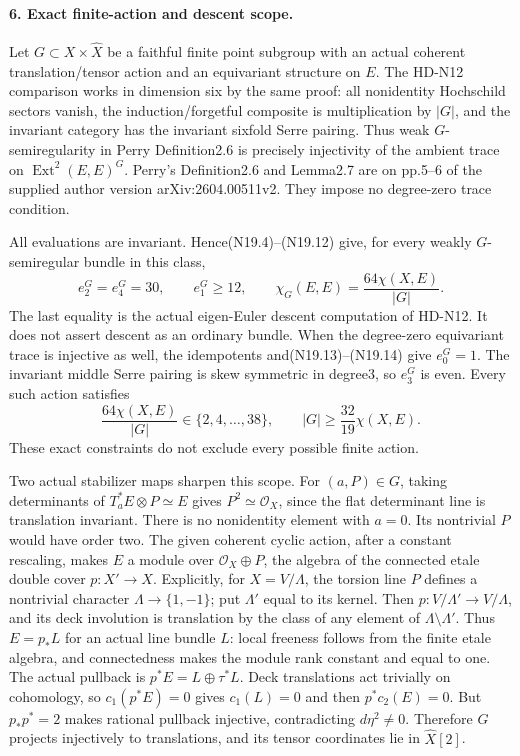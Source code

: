 \paragraph{6. Exact finite-action and descent scope.}
Let $G\subset X\times\widehat X$ be a faithful finite point subgroup
with an actual coherent translation/tensor action and an equivariant
structure on $E$. The HD-N12 comparison works in dimension six by
the same proof: all nonidentity Hochschild sectors vanish, the
induction/forgetful composite is multiplication by $|G|$, and the
invariant category has the invariant sixfold Serre pairing.
Thus weak $G$-semiregularity in Perry Definition2.6 is precisely
injectivity of the ambient trace on $\operatorname{Ext}^2(E,E)^G$.
Perry's Definition2.6 and Lemma2.7 are on pp.5--6 of the supplied
author version arXiv:2604.00511v2. They impose no degree-zero
trace condition.

All evaluations are invariant. Hence(N19.4)--(N19.12) give, for
every weakly $G$-semiregular bundle in this class,
\[
 e_2^G=e_4^G=30,\qquad e_1^G\ge12,\qquad
               \chi_G(E,E)=\frac{64\chi(X,E)}{|G|}.             \tag{N19.18}
\]
The last equality is the actual eigen-Euler descent computation
of HD-N12. It does not assert descent as an ordinary bundle.
When the degree-zero equivariant trace is injective as well,
the idempotents and(N19.13)--(N19.14) give $e_0^G=1$.
The invariant middle Serre pairing is skew symmetric in degree3,
so $e_3^G$ is even. Every such action satisfies
\[
 \frac{64\chi(X,E)}{|G|}\in\{2,4,\ldots,38\},\qquad
                       |G|\ge\frac{32}{19}\chi(X,E).           \tag{N19.19}
\]
These exact constraints do not exclude every possible finite action.

Two actual stabilizer maps sharpen this scope. For $(a,P)\in G$,
taking determinants of $T_a^*E\otimes P\simeq E$ gives
$P^2\simeq\mathcal O_X$, since the flat determinant line is
translation invariant. There is no nonidentity element with $a=0$.
Its nontrivial $P$ would have order two. The given coherent cyclic
action, after a constant rescaling, makes $E$ a module over
$\mathcal O_X\oplus P$, the algebra of the connected etale double
cover $p:X'\to X$. Explicitly, for $X=V/\Lambda$, the torsion
line $P$ defines a nontrivial character $\Lambda\to\{1,-1\}$;
put $\Lambda'$ equal to its kernel. Then
$p:V/\Lambda'\to V/\Lambda$, and its deck involution is
translation by the class of any element of $\Lambda\setminus\Lambda'$.
Thus $E=p_*L$ for an actual line bundle $L$:
local freeness follows from the finite etale algebra, and connectedness
makes the module rank constant and equal to one. The actual pullback
is $p^*E=L\oplus\tau^*L$. Deck translations act trivially on cohomology,
so $c_1(p^*E)=0$ gives $c_1(L)=0$ and then $p^*c_2(E)=0$.
But $p_*p^*=2$ makes rational pullback injective, contradicting
$d\eta^2\ne0$. Therefore $G$ projects injectively to translations,
and its tensor coordinates lie in $\widehat X[2]$.

